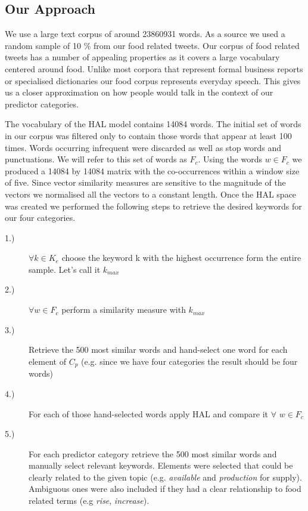 \subsection{Our Approach}

We use a large text corpus of around 23860931 words. As a source we used a random sample of 10 \% from our food related tweets. Our corpus of food related tweets has a number of appealing properties as it covers a large vocabulary centered around food. Unlike most corpora that represent formal business reports or specialised dictionaries our food corpus represents everyday speech. This gives us a closer approximation on how people would talk in the context of our predictor categories. 

The vocabulary of the HAL model contains 14084 words. The initial set of words in our corpus was filtered only to contain those words that appear at least 100 times. Words occurring infrequent were discarded as well as stop words and punctuations. We will refer to this set of words as $F_c$. Using the words $w \in F_c$ we produced a 14084 by 14084 matrix with the co-occurrences within a window size of five. Since vector similarity measures are sensitive to the magnitude of the vectors we normalised all the vectors to a constant length. Once the HAL space was created we performed the following steps to retrieve the desired keywords for our four categories. 


\begin{description}
  \item[1.)] $\forall k \in K_e$ choose the keyword k with the highest occurrence form the entire sample. Let's call it $k_{max}$  
  \item[2.)] $\forall w \in F_c $ perform a similarity measure with $k_{max}$
  \item[3.)] Retrieve the 500 most similar words and hand-select one word for each element of $C_p$ (e.g. since we have four categories the result should be four words)
  \item[4.)] For each of those hand-selected words  apply HAL and compare it $\forall$ $w \in F_c $
  \item[5.)] For each predictor category retrieve the 500 most similar words and manually select relevant keywords. Elements were selected that could be clearly related to the given topic (e.g. \emph{available} and \emph {production} for supply). Ambiguous ones were also included if they had a clear relationship to food related terms (e.g \emph{rise}, \emph {increase}).
  \end{description}

